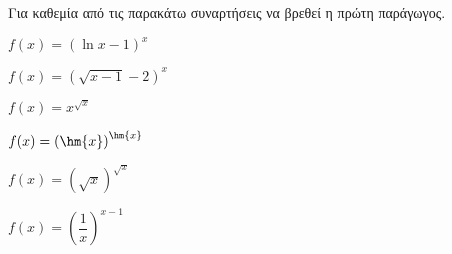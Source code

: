 Για καθεμία από τις παρακάτω συναρτήσεις να βρεθεί η πρώτη παράγωγος.
\begin{multicols}{2}
\begin{alist}
\item $ f(x)=(\ln{x}-1)^x $
\item $ f(x)=\left(\sqrt{x-1}-2\right)^x $
\item $ f(x)=x^{\sqrt{x}} $
\item $ f(x)=\left(\hm{x}\right)^{\hm{x}} $
\item $ f(x)=\left(\sqrt{x}\right)^{\sqrt{x}} $
\item $ f(x)=\left(\dfrac{1}{x}\right)^{x-1} $
\end{alist}
\end{multicols}

